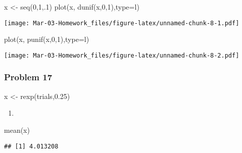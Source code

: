 \documentclass[
]{article}
\newenvironment{Shaded}{\begin{snugshade}}{\end{snugshade}}
\newcommand{\AttributeTok}[1]{\textcolor[rgb]{0.77,0.63,0.00}{#1}}
\newcommand{\DecValTok}[1]{\textcolor[rgb]{0.00,0.00,0.81}{#1}}
\newcommand{\FloatTok}[1]{\textcolor[rgb]{0.00,0.00,0.81}{#1}}
\newcommand{\FunctionTok}[1]{\textcolor[rgb]{0.00,0.00,0.00}{#1}}
\newcommand{\NormalTok}[1]{#1}
\newcommand{\OtherTok}[1]{\textcolor[rgb]{0.56,0.35,0.01}{#1}}
\newcommand{\StringTok}[1]{\textcolor[rgb]{0.31,0.60,0.02}{#1}}
\providecommand{\tightlist}{%
  \setlength{\itemsep}{0pt}\setlength{\parskip}{0pt}}
\begin{document}
\begin{Shaded}
\begin{Highlighting}[]
\NormalTok{x }\OtherTok{\textless{}{-}} \FunctionTok{seq}\NormalTok{(}\DecValTok{0}\NormalTok{,}\DecValTok{1}\NormalTok{,.}\DecValTok{1}\NormalTok{)}
\FunctionTok{plot}\NormalTok{(x, }\FunctionTok{dunif}\NormalTok{(x,}\DecValTok{0}\NormalTok{,}\DecValTok{1}\NormalTok{),}\AttributeTok{type=}\StringTok{\textquotesingle{}l\textquotesingle{}}\NormalTok{) }
\end{Highlighting}
\end{Shaded}

\texttt{[image: Mar-03-Homework\_files/figure-latex/unnamed-chunk-8-1.pdf]}

\begin{Shaded}
\begin{Highlighting}[]
\FunctionTok{plot}\NormalTok{(x, }\FunctionTok{punif}\NormalTok{(x,}\DecValTok{0}\NormalTok{,}\DecValTok{1}\NormalTok{),}\AttributeTok{type=}\StringTok{\textquotesingle{}l\textquotesingle{}}\NormalTok{) }
\end{Highlighting}
\end{Shaded}

\texttt{[image: Mar-03-Homework\_files/figure-latex/unnamed-chunk-8-2.pdf]}

\hypertarget{problem-17}{%
\subsubsection{Problem 17}\label{problem-17}}

\begin{Shaded}
\begin{Highlighting}[]
\NormalTok{x }\OtherTok{\textless{}{-}} \FunctionTok{rexp}\NormalTok{(trials,}\FloatTok{0.25}\NormalTok{)}
\end{Highlighting}
\end{Shaded}

\begin{enumerate}
\def\labelenumi{\alph{enumi}.}
\tightlist
\item
\end{enumerate}

\begin{Shaded}
\begin{Highlighting}[]
\FunctionTok{mean}\NormalTok{(x)}
\end{Highlighting}
\end{Shaded}

\begin{verbatim}
## [1] 4.013208
\end{verbatim}
\end{document}

